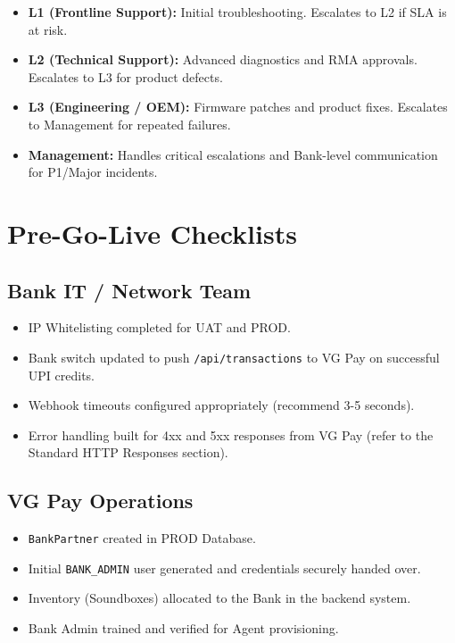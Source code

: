\documentclass[11pt,a4paper]{article}
\begin{document}
\begin{itemize}
    \item \textbf{L1 (Frontline Support):} Initial troubleshooting. Escalates to L2 if SLA is at risk.
    \item \textbf{L2 (Technical Support):} Advanced diagnostics and RMA approvals. Escalates to L3 for product defects.
    \item \textbf{L3 (Engineering / OEM):} Firmware patches and product fixes. Escalates to Management for repeated failures.
    \item \textbf{Management:} Handles critical escalations and Bank-level communication for P1/Major incidents.
\end{itemize}

\newpage
\section{Pre-Go-Live Checklists}

\subsection{Bank IT / Network Team}
\begin{itemize}[label=$\square$]
    \item IP Whitelisting completed for UAT and PROD.
    \item Bank switch updated to push \texttt{/api/transactions} to VG Pay on successful UPI credits.
    \item Webhook timeouts configured appropriately (recommend 3-5 seconds).
    \item Error handling built for 4xx and 5xx responses from VG Pay (refer to the Standard HTTP Responses section).
\end{itemize}

\subsection{VG Pay Operations}
\begin{itemize}[label=$\square$]
    \item \texttt{BankPartner} created in PROD Database.
    \item Initial \texttt{BANK\_ADMIN} user generated and credentials securely handed over.
    \item Inventory (Soundboxes) allocated to the Bank in the backend system.
    \item Bank Admin trained and verified for Agent provisioning.
\end{itemize}
\end{document}
